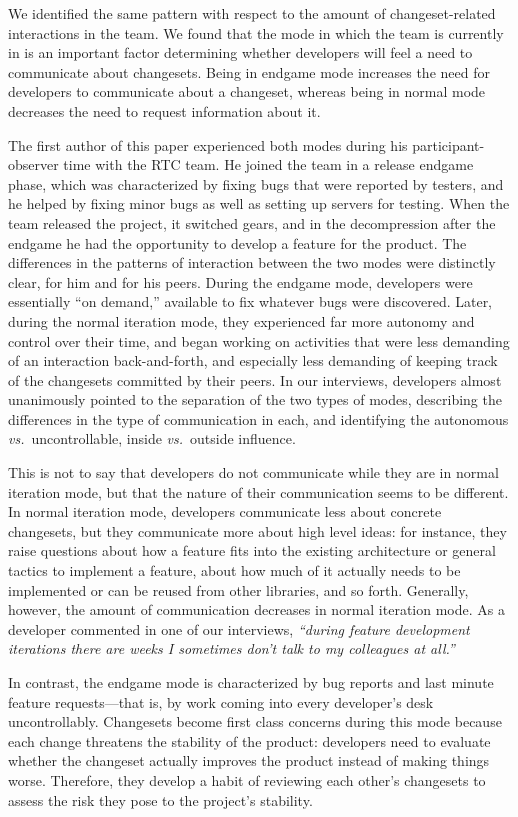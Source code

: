 We identified the same pattern with respect to the amount of changeset-related interactions in the team. We found that the mode in which the team is currently in is an important factor determining whether developers will feel a need to communicate about changesets. Being in endgame mode increases the need for developers to communicate about a changeset, whereas being in normal mode decreases the need to request information about it.

The first author of this paper experienced both modes during his participant-observer time with the RTC team. He joined the team in a release endgame phase, which was characterized by fixing bugs that were reported by testers, and he helped by fixing minor bugs as well as setting up servers for testing. When the team released the project, it switched gears, and in the decompression after the endgame he had the opportunity to develop a feature for the product. The differences in the patterns of interaction between the two modes were distinctly clear, for him and for his peers. During the endgame mode, developers were essentially ``on demand,'' available to fix whatever bugs were discovered. Later, during the normal iteration mode, they experienced far more autonomy and control over their time, and began working on activities that were less demanding of an interaction back-and-forth, and especially less demanding of keeping track of the changesets committed by their peers. In our interviews, developers almost unanimously pointed to the separation of the two types of modes, describing the differences in the type of communication in each, and identifying the autonomous \emph{vs.}~uncontrollable, inside \emph{vs.}~outside influence.

This is not to say that developers do not communicate while they are in normal iteration  mode, but that the nature of their communication seems to be different. In normal iteration mode, developers communicate less about concrete changesets, but they communicate more about high level ideas: for instance, they raise questions about how a feature fits into the existing architecture or general tactics to implement a feature, about how much of it actually needs to be implemented or can be reused from other libraries, and so forth. Generally, however, the amount of communication decreases in normal iteration mode. As a developer commented in one of our interviews, \emph{``during feature development iterations there are weeks I sometimes don't talk to my colleagues at all.''} 

In contrast, the endgame mode is characterized by bug reports and last minute feature requests---that is, by work coming into every developer's desk uncontrollably. Changesets become first class concerns during this mode because each change threatens the stability of the product: developers need to evaluate whether the changeset actually improves the product instead of making things worse. Therefore, they develop a habit of reviewing each other's changesets to assess the risk they pose to the project's stability.

